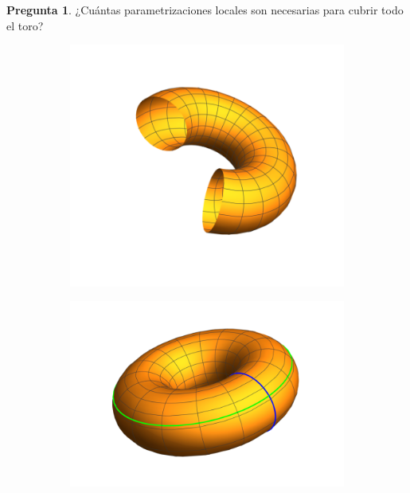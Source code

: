\documentclass[spanish]{book}
\theoremstyle{definition}
\newtheorem*{pregunta}{Pregunta}
\begin{document}
\begin{pregunta}
		¿Cuántas parametrizaciones locales son necesarias para cubrir todo el toro?
\end{pregunta}
\begin{figure}[H]
	\begin{subfigure}{0.5\textwidth}
			\centering
		\includegraphics[width=\linewidth]{sup1}
	\end{subfigure}
	\begin{subfigure}{0.5\textwidth}
		\centering
		\includegraphics[width=\linewidth]{sup2}
	\end{subfigure}
\end{figure}
\end{document}
